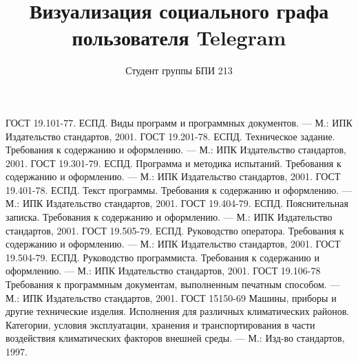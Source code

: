 \documentclass{TechDoc}
\title{Визуализация социального графа пользователя Telegram}
\author{Студент группы БПИ 213}{Н. А. Бирюлин}
\begin{document}
    \maketitle
    
    \tableofcontents

    

    

    

    

    

    


    \begin{thebibliography}{9}
         ГОСТ 19.101-77. ЕСПД. Виды программ и программных документов. --- М.: ИПК Издательство стандартов, 2001.
         ГОСТ 19.201-78. ЕСПД. Техническое задание. Требования к содержанию и оформлению. --- М.: ИПК Издательство стандартов, 2001.
         ГОСТ 19.301-79. ЕСПД. Программа и методика испытаний. Требования к содержанию и оформлению. --- М.: ИПК Издательство стандартов, 2001.
         ГОСТ 19.401-78. ЕСПД. Текст программы. Требования к содержанию и оформлению. --- М.: ИПК Издательство стандартов, 2001.
         ГОСТ 19.404-79. ЕСПД. Пояснительная записка. Требования к содержанию и оформлению. --- М.: ИПК Издательство стандартов, 2001.
         ГОСТ 19.505-79. ЕСПД. Руководство оператора. Требования к содержанию и оформлению. --- М.: ИПК Издательство стандартов, 2001.
         ГОСТ 19.504-79. ЕСПД. Руководство программиста. Требования к содержанию и оформлению. --- М.: ИПК Издательство стандартов, 2001.
         ГОСТ 19.106-78 Требования к программным документам, выполненным печатным способом. --- М.: ИПК Издательство стандартов, 2001.
         ГОСТ 15150-69 Машины, приборы и другие технические изделия. Исполнения для различных климатических районов. Категории, условия эксплуатации, хранения и транспортирования в части воздействия климатических факторов внешней среды. --- М.: Изд-во стандартов, 1997.
    \end{thebibliography}

    \registrationList
        
\end{document}
